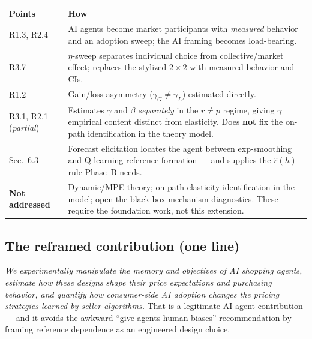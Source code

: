 \documentclass[11pt]{article}
\newcommand{\crit}[1]{\textcolor{crit}{\textbf{#1}}}
\begin{document}
\renewcommand{\arraystretch}{1.2}
\begin{center}
\begin{tabular}{@{}p{}p{}@{}}
\toprule
\textbf{Points} & \textbf{How} \\
\midrule
R1.3, R2.4 & AI agents become market participants with \emph{measured} behavior and an adoption sweep; the
AI framing becomes load-bearing. \\
R3.7 & $\eta$-sweep separates individual choice from collective/market effect; replaces the stylized
$2\times2$ with measured behavior and CIs. \\
R1.2 & Gain/loss asymmetry ($\gamma_G\neq\gamma_L$) estimated directly. \\
R3.1, R2.1 (\emph{partial}) & Estimates $\gamma$ and $\beta$ \emph{separately} in the $r\neq p$ regime,
giving $\gamma$ empirical content distinct from elasticity. Does \crit{not} fix the on-path identification
in the theory model. \\
Sec.~6.3 & Forecast elicitation locates the agent between exp-smoothing and Q-learning reference formation
--- and supplies the $\hat r(h)$ rule Phase~B needs. \\
\midrule
\crit{Not addressed} & Dynamic/MPE theory; on-path elasticity identification in the model;
open-the-black-box mechanism diagnostics. These require the foundation work, not this extension. \\
\bottomrule
\end{tabular}
\end{center}

\subsection*{The reframed contribution (one line)}

\emph{We experimentally manipulate the memory and objectives of AI shopping agents, estimate how these
designs shape their price expectations and purchasing behavior, and quantify how consumer-side AI adoption
changes the pricing strategies learned by seller algorithms.} That is a legitimate AI-agent contribution
--- and it avoids the awkward ``give agents human biases'' recommendation by framing reference dependence
as an engineered design choice.
\end{document}
